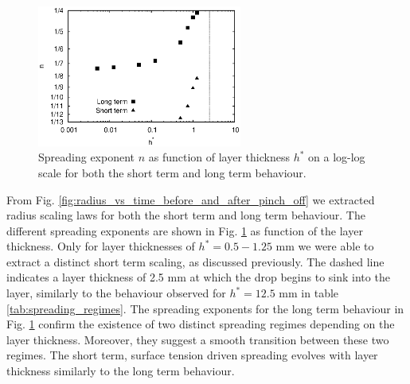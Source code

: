 \documentclass[aip,graphicx]{revtex4-1}
\begin{document}
\begin{figure}[!ht]
\centering
\includegraphics[width=0.6\textwidth]{figures/scaling_vs_layer_inc_short_time.eps}
\caption{Spreading exponent $n$ as function of layer thickness $h^*$
  on a log-log scale for both the short term and long term behaviour.}
\label{fig:scaling_vs_layer}
\end{figure}

From Fig. \ref{fig:radius_vs_time_before_and_after_pinch_off} we
extracted radius scaling laws for both the short term and long term
behaviour.  The different spreading exponents are shown in Fig.
\ref{fig:scaling_vs_layer} as function of the layer thickness.  Only
for layer thicknesses of $h^*=0.5 - 1.25$ mm we were able to extract
a distinct short term scaling, as discussed previously.  The dashed
line indicates a layer thickness of 2.5 mm at which the drop begins to
sink into the layer, similarly to the behaviour observed for
$h^*=12.5$ mm in table \ref{tab:spreading_regimes}.  The spreading
exponents for the long term behaviour in Fig.
\ref{fig:scaling_vs_layer} confirm the existence of two distinct
spreading regimes depending on the layer thickness.  Moreover, they
suggest a smooth transition between these two regimes.  The short
term, surface tension driven spreading evolves with layer thickness
similarly to the long term behaviour. \\
\end{document}
